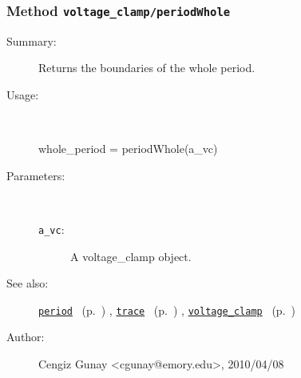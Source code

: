 \subsubsection[Method \texttt{periodWhole}]{Method \texttt{voltage\_clamp/periodWhole}}%
%
\label{ref_voltage_clamp__periodWhole}%
\hypertarget{ref_voltage_clamp__periodWhole}{}%
\begin{description}
\item[Summary:]Returns the boundaries of the whole period. 
%
\item[Usage:]~%
\begin{lyxcode}%
whole\_period = periodWhole(a\_vc)
%
\end{lyxcode}%
%
%
\item[Parameters:]~
\begin{description}%
\item[\texttt{a\_vc}:]
 A voltage\_clamp object.
\end{description}%
%
%
%
\item[See also:]%
\hyperlink{ref_period}{\texttt{period}}%
\ (p.~\pageref{ref_period})%
%
, \hyperlink{ref_trace}{\texttt{trace}}%
\ (p.~\pageref{ref_trace})%
%
, \hyperlink{ref_voltage_clamp}{\texttt{voltage\_clamp}}%
\ (p.~\pageref{ref_voltage_clamp})%
%
%
\item[Author:]%
Cengiz Gunay <cgunay@emory.edu>, 2010/04/08
%
\end{description}
\methodline%
